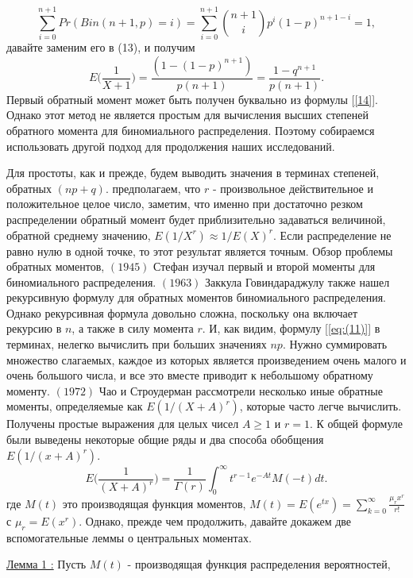 \documentclass[13pt]{article}
\begin{document}
\[ \sum_{i=0}^{n+1} Pr(Bin(n+1,p)=i) = \sum_{i=0}^{n+1} \binom{n+1}{i} p^i (1-p)^{n+1-i} = 1, \]
давайте заменим его в (13), и получим
\begin{equation}\label{14}
    E\bigg(\frac{1}{X+1}\bigg)=\frac{(1-(1-p)^{n+1})}{p(n+1)}=\frac{1-q^{n+1}}{p(n+1)}.
\end{equation}
Первый обратный момент может быть получен буквально из формулы [\ref{14}]. Однако этот метод не является простым для вычисления высших степеней обратного момента для биномиального распределения. Поэтому собираемся использовать другой подход для продолжения наших исследований.\par
 Для простоты, как и прежде, будем выводить значения в терминах степеней, обратных $(np + q)$. предполагаем, что $r$ - произвольное действительное и положительное целое число, заметим, что именно при достаточно резком распределении обратный момент будет приблизительно задаваться величиной, обратной среднему значению, $E(1/X^{r})\approx 1/E(X)^r$. Если распределение не равно нулю в одной точке, то этот результат является точным. Обзор проблемы обратных моментов, $ (1945)$ Стефан \cite{stephan1945expected} изучал первый и второй моменты для биномиального распределения. $(1963)$ Заккула Говиндараджулу \cite{govindarajulu1963recurrence} также нашел рекурсивную формулу для обратных моментов биномиального распределения. Однако рекурсивная формула довольно сложна, поскольку она включает рекурсию в $n$, а также в силу момента $r$. И, как видим, формулу [\ref{eq:(11)}] в терминах, нелегко вычислить при больших значениях $np$. Нужно суммировать множество слагаемых, каждое из которых является произведением очень малого и очень большого числа, и все это вместе приводит к небольшому обратному моменту. $ (1972)$ Чао и Строудерман рассмотрели несколько иные обратные моменты, определяемые как $E(1/(X+ A)^r)$, которые часто легче вычислить. Получены простые выражения для целых чисел $A \ge 1$ и $r = 1$. К общей формуле были выведены некоторые общие ряды и два способа обобщения $E(1/(x+ A)^r)$.
\begin{equation}\label{12}
    E\Big(\frac{1}{(X+A)^{r}}\Big) = \frac{1}{\Gamma(r)}\int_{0}^{\infty}t^{r-1}e^{-At}M(-t)dt .
\end{equation}
где $M(t)$ это производящая функция моментов, $M(t)=E(e^{tx})=\sum_{k=0}^{\infty}\frac{\mu_{r}x^{r}}{r!}$ с $\mu_r = E(x^{r})$.
Однако, прежде чем продолжить, давайте докажем две вспомогательные леммы о центральных моментах.\par
\underline{Лемма 1 :}\label{theorem}
Пусть $M(t)$ - производящая функция распределения вероятностей,
\end{document}
